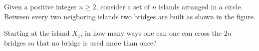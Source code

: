 Given a positive integer $ n\geq 2$,  consider a set of $ n$ islands arranged in a circle. Between every two neigboring islands two bridges are built as shown in the figure.

Starting at the island $ X_1$,  in how many ways one can one can cross the $ 2n$ bridges so that no bridge is used more than once?